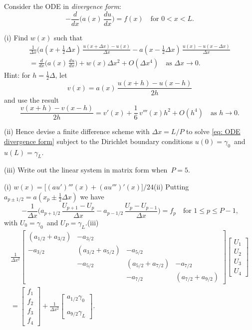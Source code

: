 \begin{Exercises}
\exercise
Consider the ODE in \emph{divergence form}:
\begin{equation}\label{eq: ODE divergence form}
-\frac{d}{dx}\biggl(a(x)\,\frac{du}{dx}\biggr)=f(x)\quad\text{for $0<x<L$.}
\end{equation}
\begin{description}
\item{(i)}
Find $w(x)$ such that
\begin{multline*}
\frac{1}{\Delta x}\biggl(
 a(x+\tfrac12\Delta x)\,\frac{u(x+\Delta x)-u(x)}{\Delta x}
-a(x-\tfrac12\Delta x)\,\frac{u(x)-u(x-\Delta x)}{\Delta x}\\
    =\frac{d}{dx}\biggl(a(x)\,\frac{du}{dx}\biggr)+w(x)\Delta x^2+O(\Delta x^4)
    \quad\text{as $\Delta x\to0$.}
\end{multline*}
Hint: for $h=\tfrac12\Delta$, let 
\[
v(x)=a(x)\,\frac{u(x+h)-u(x-h)}{2h}
\]
and use the result
\[
\frac{v(x+h)-v(x-h)}{2h}=v'(x)+\frac{1}{6}\,v'''(x)h^2+O(h^4)
    \quad\text{as $h\to0$.}
\]
\item{(ii)} Hence devise a finite difference scheme with $\Delta x=L/P$ to 
solve \eqref{eq: ODE divergence form} subject to the Dirichlet boundary 
conditions $u(0)=\gamma_0$~and $u(L)=\gamma_L$.
\item{(iii)} Write out the linear system in matrix form when~$P=5$.
\end{description}
\begin{ans}
(i) $w(x)=\bigl[(au')'''(x)+(au''')'(x)\bigr]/24$\quad (ii) Putting
$a_{p\pm1/2}=a(x_p\pm\tfrac12\Delta x)$ we have
\[
-\frac{1}{\Delta x}\biggl(a_{p+1/2}\,\frac{U_{p+1}-U_p}{\Delta x}
    -a_{p-1/2}\,\frac{U_p-U_{p-1}}{\Delta x}\biggr)=f_p
    \quad\text{for $1\le p\le P-1$,}
\]
with $U_0=\gamma_0$~and $U_P=\gamma_L$.\quad (iii)
\begin{multline*}
\frac{1}{\Delta x^2}\begin{bmatrix}
            (a_{1/2}+a_{3/2})&-a_{3/2}&&\\
   -a_{3/2}&(a_{3/2}+a_{5/2})&-a_{5/2}&\\
  &-a_{5/2}&(a_{5/2}+a_{7/2})&-a_{7/2}\\
 &&-a_{7/2}&(a_{7/2}+a_{9/2})
\end{bmatrix}
\begin{bmatrix}U_1\\ U_2\\ U_3\\ U_4\end{bmatrix}\\
=\begin{bmatrix}f_1\\ f_2\\ f_3\\ f_4 \end{bmatrix}+\frac{1}{\Delta x^2}
\begin{bmatrix}a_{1/2}\gamma_0\\ \\ \\ a_{9/2}\gamma_L \end{bmatrix}.
\end{multline*}
\end{ans}

\end{Exercises}
